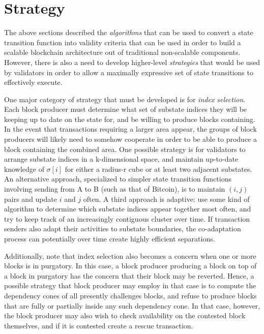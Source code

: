 \documentclass[11pt,a4paper]{report}
\theoremstyle{plain}
\theoremstyle{definition}
\theoremstyle{remark}
\begin{document}
\chapter{Strategy}

The above sections described the \emph{algorithms} that can be used to convert a state transition function into validity criteria that can be used in order to build a scalable blockchain architecture out of traditional non-scalable components. However, there is also a need to develop higher-level \emph{strategies} that would be used by validators in order to allow a maximally expressive set of state transitions to effectively execute.

One major category of strategy that must be developed is for \emph{index selection}. Each block producer must determine what set of substate indices they will be keeping up to date on the state for, and be willing to produce blocks containing. In the event that transactions requiring a larger area appear, the groups of block producers will likely need to somehow cooperate in order to be able to produce a block containing the combined area. One possible strategy is for validators to arrange substate indices in a k-dimensional space, and maintain up-to-date knowledge of $\sigma[i]$ for either a radius-r cube or at least two adjacent substates. An alternative approach, specialized to simpler state transition functions involving sending from A to B (such as that of Bitcoin), is to maintain $(i, j)$ pairs and update $i$ and $j$ often. A third approach is adaptive: use some kind of algorithm to determine which substate indices appear together most often, and try to keep track of an increasingly contiguous cluster over time. If transaction senders also adapt their activities to substate boundaries, the co-adaptation process can potentially over time create highly efficient separations.

Additionally, note that index selection also becomes a concern when one or more blocks is in purgatory. In this case, a block producer producing a block on top of a block in purgatory has the concern that their block may be reverted. Hence, a possible strategy that block producer may employ in that case is to compute the dependency cones of all presently challenges blocks, and refuse to produce blocks that are fully or partially inside any such dependency cone. In that case, however, the block producer may also wish to check availability on the contested block themselves, and if it is contested create a rescue transaction.
\end{document}

